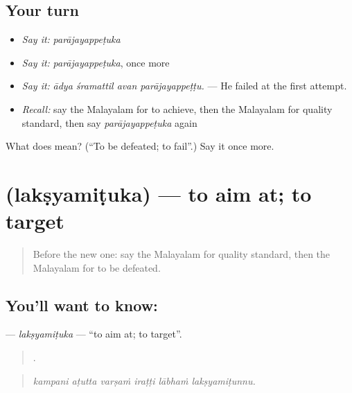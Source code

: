 \subsection*{Your turn}
\begin{itemize}
\raggedright
  \item \emph{Say it:} \emph{parājayappeṭuka}
  \item \emph{Say it:} \emph{parājayappeṭuka}, once more
  \item \emph{Say it:} \emph{ādya śramattil avan parājayappeṭṭu.} — He failed at the first attempt.
  \item \emph{Recall:} say the Malayalam for to achieve, then the Malayalam for quality standard, then say \emph{parājayappeṭuka} again
\end{itemize}

\begin{tcolorbox}[breakable,colback=teal!4,colframe=teal!35!black,title={Before you move on}]
What does  mean? (\textquotedblleft{}To be defeated; to fail\textquotedblright{}.) Say it once more.
\end{tcolorbox}
\section[\texorpdfstring{\ml{ലക്ഷ്യമിടുക} (lakṣyamiṭuka)}{ലക്ഷ്യമിടുക (lakṣyamiṭuka)}]{ (lakṣyamiṭuka) — to aim at; to target}

\label{lesson:ML-C447-laksyamituka}



\begin{quote}
Before the new one: say the Malayalam for quality standard, then the Malayalam for to be defeated.
\end{quote}

\subsection*{You'll want to know: }
\textbf{} — \emph{lakṣyamiṭuka} — \textquotedblleft{}to aim at; to target\textquotedblright{}.

\begin{quote}
     .
\end{quote}

\begin{quote}
\emph{kampani aṭutta varṣaṁ iraṭṭi lābhaṁ lakṣyamiṭunnu.}
\end{quote}

